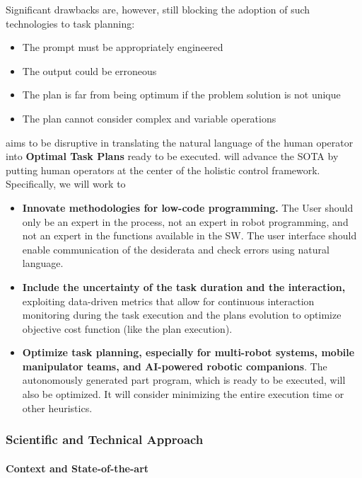 Significant drawbacks are, however, still blocking the adoption of such
technologies to task planning:

\begin{itemize}
\item
  The prompt must be appropriately engineered
\item
  The output could be erroneous
\item
  The plan is far from being optimum if the problem solution is not
  unique
\item
  The plan cannot consider complex and variable operations
\end{itemize}

 aims to be disruptive in translating the natural
language of the human operator into \textbf{Optimal Task Plans} ready to
be executed.  will advance the SOTA by putting human
operators at the center of the holistic control framework. Specifically,
we will work to

\begin{itemize}
\item
  \textbf{Innovate methodologies for low-code programming.} The User
  should only be an expert in the process, not an expert in robot
  programming, and not an expert in the functions available in the SW.
  The user interface should enable communication of the desiderata and
  check errors using natural language.
\item
  \textbf{Include the uncertainty of the task duration and the
  interaction,} exploiting data-driven metrics that allow for continuous
  interaction monitoring during the task execution and the
  plan\textquotesingle s evolution to optimize objective cost function
  (like the plan execution).
\item
  \textbf{Optimize task planning, especially for multi-robot systems,
  mobile manipulator teams, and AI-powered robotic companions}. The
  autonomously generated part program, which is ready to be executed,
  will also be optimized. It will consider minimizing the entire
  execution time or other heuristics.
\end{itemize}

\subsubsection{Scientific and Technical
Approach}\label{scientific-and-technical-approach}

\paragraph{Context and
State-of-the-art}\label{context-and-state-of-the-art}

